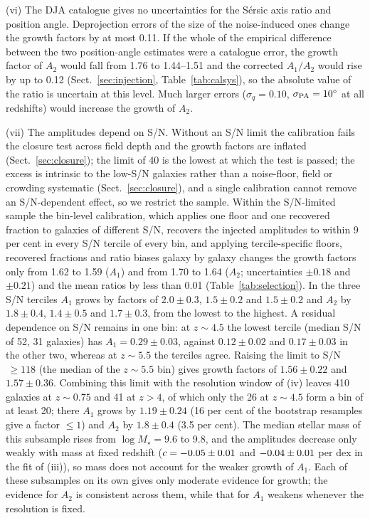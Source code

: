 \documentclass[fleqn,usenatbib]{mnras}
\newcommand{\Mstar}{M_\star}
\begin{document}
(vi) The DJA catalogue gives no uncertainties for the S\'ersic axis ratio and
position angle. Deprojection errors of the size of the noise-induced ones change
the growth factors by at most 0.11. If the whole of the empirical difference
between the two position-angle estimates were a catalogue error, the growth
factor of $A_2$ would fall from 1.76 to 1.44--1.51 and the corrected $A_1/A_2$
would rise by up to 0.12 (Sect.~\ref{sec:injection}, Table~\ref{tab:calsys}), so
the absolute value of the ratio is uncertain at this level. Much larger errors
($\sigma_q=0.10$, $\sigma_{\rm PA}=10^\circ$ at all redshifts) would increase the
growth of $A_2$.

(vii) The amplitudes depend on S/N. Without an S/N limit the calibration fails
the closure test across field depth and the growth factors are inflated
(Sect.~\ref{sec:closure}); the limit of 40 is the lowest at which the test is
passed; the excess is intrinsic to the low-S/N galaxies rather than a
noise-floor, field or crowding systematic (Sect.~\ref{sec:closure}), and a single
calibration cannot remove an S/N-dependent effect, so we restrict the sample. Within the S/N-limited sample the bin-level calibration, which
applies one floor and one recovered fraction to galaxies of different S/N,
recovers the injected amplitudes to within 9 per cent in every S/N tercile of
every bin, and applying tercile-specific floors, recovered fractions and ratio
biases galaxy by galaxy changes the growth factors only from 1.62 to 1.59 ($A_1$)
and from 1.70 to 1.64 ($A_2$; uncertainties $\pm0.18$ and $\pm0.21$) and the mean
ratios by less than 0.01 (Table~\ref{tab:selection}). In the three S/N terciles
$A_1$ grows by factors of $2.0\pm0.3$, $1.5\pm0.2$ and $1.5\pm0.2$ and $A_2$ by
$1.8\pm0.4$, $1.4\pm0.5$ and $1.7\pm0.3$, from the lowest to the highest. A
residual dependence on S/N remains in one bin: at $z\sim4.5$ the lowest tercile
(median S/N of 52, 31 galaxies) has $A_1=0.29\pm0.03$, against $0.12\pm0.02$ and
$0.17\pm0.03$ in the other two, whereas at $z\sim5.5$ the terciles agree. Raising
the limit to S/N$\,\geq118$ (the median of the $z\sim5.5$ bin) gives growth
factors of $1.56\pm0.22$ and $1.57\pm0.36$. Combining this limit with the
resolution window of (iv) leaves 410 galaxies at $z\sim0.75$ and 41 at $z>4$, of
which only the 26 at $z\sim4.5$ form a bin of at least 20; there $A_1$ grows by
$1.19\pm0.24$ (16 per cent of the bootstrap resamples give a factor $\leq1$) and
$A_2$ by $1.8\pm0.4$ (3.5 per cent). The median stellar mass of this subsample
rises from $\log\Mstar=9.6$ to 9.8, and the amplitudes decrease only weakly with
mass at fixed redshift ($c=-0.05\pm0.01$ and
$-0.04\pm0.01$ per dex in the fit of (iii)), so mass does not
account for the weaker growth of $A_1$. Each of these subsamples on its own
gives only moderate evidence for growth; the evidence for $A_2$ is consistent
across them, while that for $A_1$ weakens whenever the resolution is fixed.
\end{document}
